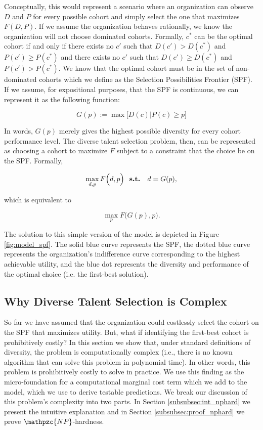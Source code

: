Conceptually, this would represent a scenario where an organization can observe $D$ and $P$ for every possible cohort and simply select the one that maximizes $F(D,P)$. If we assume the organization behaves rationally, we know the organization will not choose dominated cohorts. Formally, $c^*$ can be the optimal cohort if and only if there exists no $c'$ such that $D(c')>D(c^*)$ and $P(c')\geq P(c^*)$ and there exists no $c'$ such that $D(c')\geq D(c^*)$ and $P(c')> P(c^*)$. We know that the optimal cohort must be in the set of non-dominated cohorts which we define as the Selection Possibilities Frontier (SPF). If we assume, for expositional purposes, that the SPF is continuous, we can represent it as the following function:

\begin{equation}
G(p) := \max\Big[D(c)|P(c) \geq p\Big]
\end{equation}

\noindent In words, $G(p)$ merely gives the highest possible diversity for every cohort performance level. The diverse talent selection problem, then, can be represented as choosing a cohort to maximize $F$ subject to a constraint that the choice be on the SPF. Formally, 

\begin{equation}
\max_{d,p} F\Big(d,p\Big) \text{ \bf{ s.t. } } d = G(p), \nonumber 
\end{equation}

\noindent which is equivalent to

\begin{equation}
\max_{p} F\Big(G(p) ,p\Big). \label{eq:selection_simple}
\end{equation}

The solution to this simple version of the model is depicted in Figure \ref{fig:model_spf}. The solid blue curve represents the SPF, the dotted blue curve represents the organization's indifference curve corresponding to the highest achievable utility, and the blue dot represents the diversity and performance of the optimal choice (i.e. the first-best solution). 

\subsection{Why Diverse Talent Selection is Complex}\label{subsec:dts_nphard}

So far we have assumed that the organization could costlessly select the cohort on the SPF that maximizes utility. But, what if identifying the first-best cohort is prohibitively costly? In this section we show that, under standard definitions of diversity, the problem is computationally complex (i.e., there is no known algorithm that can solve this problem in polynomial time). In other words, this problem is prohibitively costly to solve in practice. We use this finding as the micro-foundation for a computational marginal cost term which we add to the model, which we use to derive testable predictions. We break our discussion of this problem's complexity into two parts. In Section \ref{subsubsec:int_nphard} we present the intuitive explanation and in Section \ref{subsubsec:proof_nphard} we prove $\mathpzc{NP}$-hardness. 

